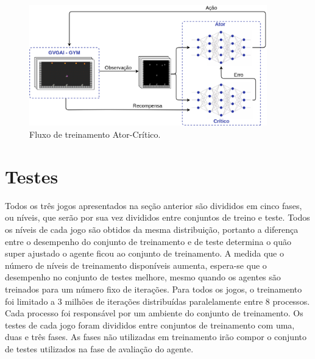 \begin{figure}[ht]
 \centering
  \includegraphics[width=0.92\textwidth]{./fig/ator-critico}
 \caption{Fluxo de treinamento Ator-Crítico.}
 \label{fig:ac}
\end{figure}

\section{Testes}

Todos os três jogos apresentados na seção anterior são divididos em cinco fases, ou níveis, que serão por sua vez divididos entre conjuntos de treino e teste. Todos os níveis de cada jogo são obtidos da mesma distribuição, portanto a diferença entre o desempenho do conjunto de treinamento e de teste determina o quão super ajustado o agente ficou ao conjunto de treinamento. A medida que o número de níveis de treinamento disponíveis aumenta, espera-se que o desempenho no conjunto de testes melhore, mesmo quando os agentes são treinados para um número fixo de iterações. Para todos os jogos, o treinamento foi limitado a 3 milhões de iterações distribuídas paralelamente entre 8 processos. Cada processo foi responsável por um ambiente do conjunto de treinamento. Os testes de cada jogo foram divididos entre conjuntos de treinamento com uma, duas e três fases. As fases não utilizadas em treinamento irão compor o conjunto de testes utilizados na fase de avaliação do agente.
